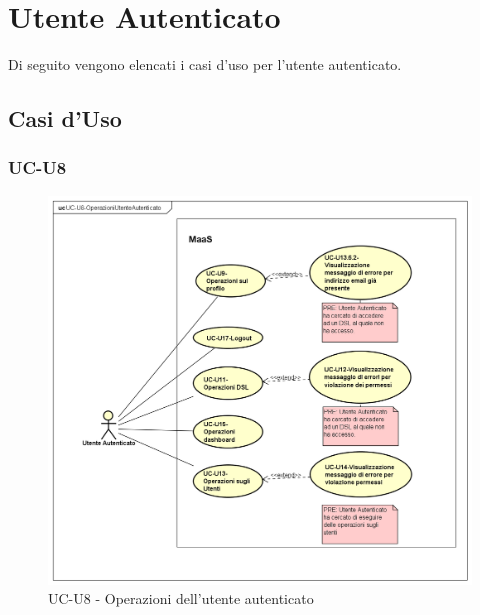 \section{Utente Autenticato}

Di seguito vengono elencati i casi d'uso per l'utente autenticato.
\subsection{Casi d'Uso}

\subsubsection{UC-U8}

    \begin{figure}[H]
      \begin{center}
        \includegraphics[width=12cm]{res/img/UCUtenti/UCUtenteA/UC-U8-OperazioniUtenteAutenticato}
      \caption{UC-U8 - Operazioni dell'utente autenticato}
      \end{center} 
    \end{figure}    
    
